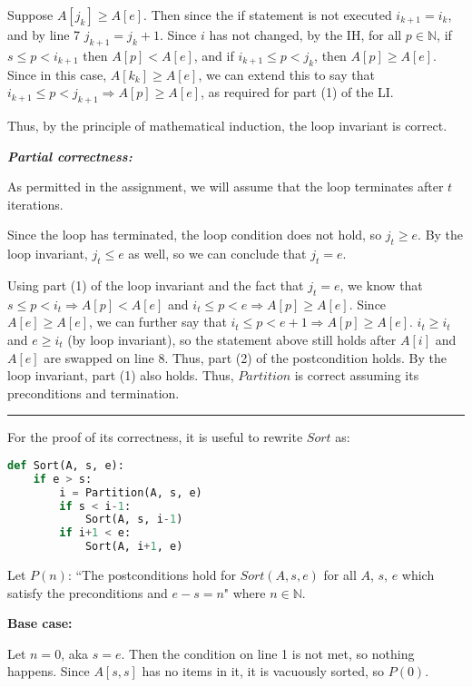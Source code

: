 \documentclass[12pt]{article}
\newcommand{\N}{\mathbb{N}}
\begin{document}
Suppose $A[j_k] \geq A[e]$. Then since the if statement is not executed $i_{k+1} = i_k$, and by line 7 $j_{k+1} = j_k + 1$. Since $i$ has not changed, by the IH, for all $p \in \N$, if $s \leq p < i_{k+1}$ then $A[p] < A[e]$, and if $i_{k+1} \leq p < j_k$, then $A[p] \geq A[e]$. Since in this case, $A[k_{k}] \geq A[e]$, we can extend this to say that $i_{k+1} \leq p < j_{k+1} \Rightarrow A[p] \geq A[e]$, as required for part (1) of the LI.

Thus, by the principle of mathematical induction, the loop invariant is correct.

\noindent \textbf{\textit{Partial correctness:}}

As permitted in the assignment, we will assume that the loop terminates after $t$ iterations.

Since the loop has terminated, the loop condition does not hold, so $j_t \geq e$. By the loop invariant, $j_t \leq e$ as well, so we can conclude that $j_t = e$.

Using part (1) of the loop invariant and the fact that $j_t = e$, we know that $s \leq p < i_t \Rightarrow A[p] < A[e]$ and $i_t \leq p < e \Rightarrow A[p] \geq A[e]$. Since $A[e] \geq A[e]$, we can further say that $i_t \leq p < e+1 \Rightarrow A[p] \geq A[e]$. $i_t \geq i_t$ and $e \geq i_t$ (by loop invariant), so the statement above still holds after $A[i]$ and $A[e]$ are swapped on line 8. Thus, part (2) of the postcondition holds. By the loop invariant, part (1) also holds. Thus, $Partition$ is correct assuming its preconditions and termination.

\hfill

\hrule

\hfill

\noindent For the proof of its correctness, it is useful to rewrite $Sort$ as:
\begin{lstlisting}[language=Python, firstnumber=0]
def Sort(A, s, e):
    if e > s:
        i = Partition(A, s, e)
        if s < i-1:
            Sort(A, s, i-1)
        if i+1 < e:
            Sort(A, i+1, e)
\end{lstlisting}

Let $P(n)$: ``The postconditions hold for $Sort(A, s, e)$ for all $A$, $s$, $e$ which satisfy the preconditions and $e - s = n$" where $n \in \N$.

\noindent \textbf{Base case:}

Let $n = 0$, aka $s = e$. Then the condition on line 1 is not met, so nothing happens. Since $A[s,s]$ has no items in it, it is vacuously sorted, so $P(0)$.
\end{document}

